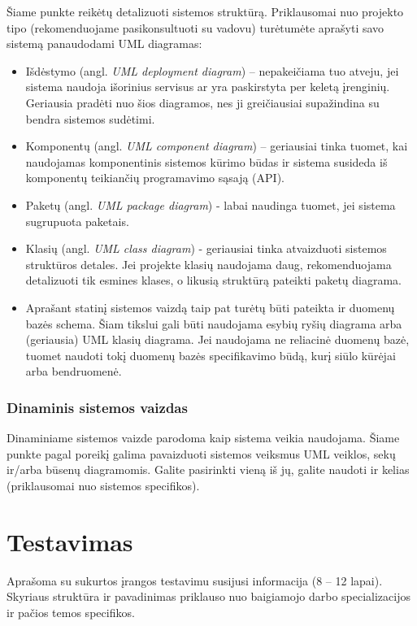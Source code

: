 \documentclass{ktuthesis}
\begin{document}
	Šiame punkte reikėtų detalizuoti sistemos struktūrą. Priklausomai nuo projekto tipo (rekomenduojame pasikonsultuoti su vadovu) turėtumėte aprašyti
	savo sistemą panaudodami UML diagramas:
	\begin{itemize}[label={--}]
		\item Išdėstymo (angl. \textit{UML deployment diagram}) – nepakeičiama tuo atveju, jei sistema naudoja išorinius servisus ar yra paskirstyta
		per keletą įrenginių. Geriausia pradėti nuo šios diagramos, nes ji greičiausiai supažindina su bendra sistemos sudėtimi.
		\item Komponentų (angl. \textit{UML component diagram}) – geriausiai tinka tuomet, kai naudojamas komponentinis sistemos kūrimo būdas ir sistema
		susideda iš komponentų teikiančių programavimo sąsają (API).
		\item Paketų (angl. \textit{UML package diagram}) - labai naudinga tuomet, jei sistema sugrupuota paketais.
		\item Klasių (angl. \textit{UML class diagram}) - geriausiai tinka atvaizduoti sistemos struktūros detales. Jei projekte klasių naudojama daug,
		rekomenduojama detalizuoti tik esmines klases, o likusią struktūrą pateikti paketų diagrama.
		\item Aprašant statinį sistemos vaizdą taip pat turėtų būti pateikta ir duomenų bazės schema. Šiam tikslui gali būti naudojama esybių ryšių diagrama arba (geriausia)
		UML klasių diagrama. Jei naudojama ne reliacinė duomenų bazė, tuomet naudoti tokį duomenų bazės specifikavimo būdą, kurį siūlo kūrėjai arba bendruomenė.
	\end{itemize}
	
	\subsubsection{Dinaminis sistemos vaizdas}
	
	Dinaminiame sistemos vaizde parodoma kaip sistema veikia naudojama. Šiame
	punkte pagal poreikį galima pavaizduoti sistemos veiksmus UML veiklos, sekų
	ir/arba būsenų diagramomis. Galite pasirinkti vieną iš jų, galite naudoti ir
	kelias (priklausomai nuo sistemos specifikos).
	
	\section{Testavimas}
	
	Aprašoma su sukurtos įrangos testavimu susijusi informacija (8 – 12 lapai). Skyriaus struktūra ir pavadinimas priklauso nuo baigiamojo darbo
	specializacijos ir pačios temos specifikos.
	
\end{document}
